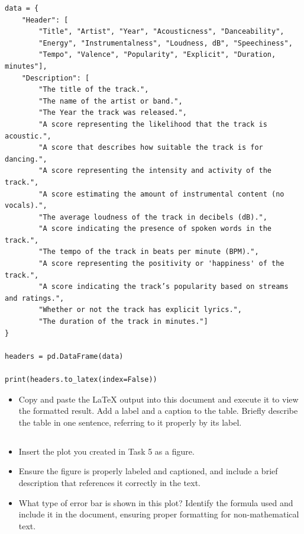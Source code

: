 \documentclass[
	german,
	accentcolor=9c,%
	type=intern,
	marginpar=false
	]{tudapub}
\begin{document}
\begin{verbatim}
data = {
    "Header": [
        "Title", "Artist", "Year", "Acousticness", "Danceability", 
        "Energy", "Instrumentalness", "Loudness, dB", "Speechiness", 
        "Tempo", "Valence", "Popularity", "Explicit", "Duration, minutes"],
    "Description": [
        "The title of the track.", 
        "The name of the artist or band.",
        "The Year the track was released.",
        "A score representing the likelihood that the track is acoustic.",
        "A score that describes how suitable the track is for dancing.",
        "A score representing the intensity and activity of the track.",
        "A score estimating the amount of instrumental content (no vocals).",
        "The average loudness of the track in decibels (dB).",
        "A score indicating the presence of spoken words in the track.",
        "The tempo of the track in beats per minute (BPM).",
        "A score representing the positivity or 'happiness' of the track.",
        "A score indicating the track’s popularity based on streams and ratings.",
        "Whether or not the track has explicit lyrics.",
        "The duration of the track in minutes."]
}

headers = pd.DataFrame(data)

print(headers.to_latex(index=False))
\end{verbatim}

\begin{itemize}
\item Copy and paste the LaTeX output into this document and execute it to view the formatted result. Add a label and a caption to the table. Briefly describe the table in one sentence, referring to it properly by its label.
\end{itemize}

\subsection{}
\begin{itemize}
\item Insert the plot you created in Task 5 as a figure.
\item Ensure the figure is properly labeled and captioned, and include a brief description that references it correctly in the text.
\item What type of error bar is shown in this plot? Identify the formula used and include it in the document, ensuring proper formatting for non-mathematical text.
\end{itemize}
\end{document}
